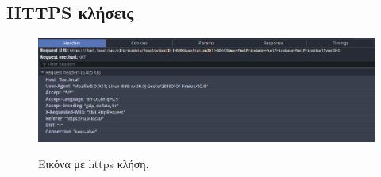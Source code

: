 \subsection{HTTPS κλήσεις}

\begin{figure}[H]
  \caption{Εικόνα με https κλήση.}
  \centering
    \includegraphics[width=1\textwidth]{img/https.png}
    \label{fig:https}
\end{figure}